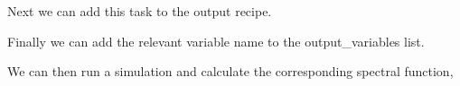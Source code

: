 \documentclass[letterpaper,10pt,english]{sphinxmanual}
\begin{document}
\sphinxAtStartPar
Next we can add this task to the output recipe.

\begin{sphinxVerbatim}[commandchars=\\\{\}]
\end{sphinxVerbatim}

\sphinxAtStartPar
Finally we can add the relevant variable name to the output\_variables list.

\begin{sphinxVerbatim}[commandchars=\\\{\}]
\end{sphinxVerbatim}

\sphinxAtStartPar
We can then run a simulation and calculate the corresponding spectral function,
\end{document}
